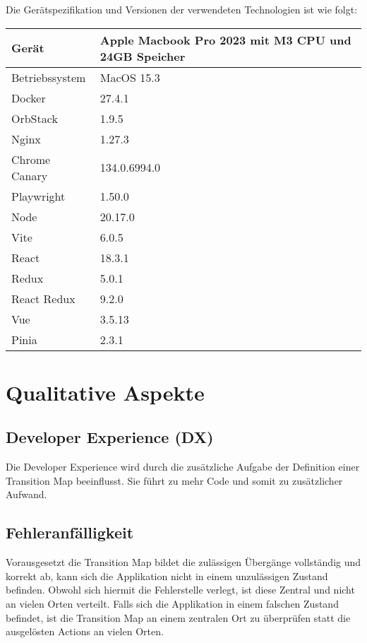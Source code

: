 Die Gerätspezifikation und Versionen der verwendeten Technologien ist wie folgt:

\begin{center}
  \begin{tabular}{ | m{5cm}| m{5cm} | } 
    \hline
    Gerät & Apple Macbook Pro 2023 mit M3 CPU und 24GB Speicher \\ 
    \hline
    Betriebssystem & MacOS 15.3 \\ 
    \hline
    Docker & 27.4.1 \\ 
    \hline
    OrbStack & 1.9.5 \\ 
    \hline
    Nginx & 1.27.3 \\ 
    \hline
    Chrome Canary & 134.0.6994.0 \\ 
    \hline
    Playwright & 1.50.0 \\ 
    \hline
    Node & 20.17.0 \\ 
    \hline
    Vite & 6.0.5 \\ 
    \hline
    React & 18.3.1 \\ 
    \hline
    Redux & 5.0.1 \\ 
    \hline
    React Redux & 9.2.0 \\ 
    \hline
    Vue & 3.5.13 \\ 
    \hline
    Pinia & 2.3.1 \\ 
    \hline
  \end{tabular}
\end{center}

\section{Qualitative Aspekte}

\subsection{Developer Experience (DX)}
Die Developer Experience wird durch die zusätzliche Aufgabe der Definition einer Transition Map beeinflusst. Sie führt zu mehr Code und somit zu zusätzlicher Aufwand.

\subsection{Fehleranfälligkeit}
Vorausgesetzt die Transition Map bildet die zulässigen Übergänge vollständig und korrekt ab, kann sich die Applikation nicht in einem unzulässigen Zustand befinden. Obwohl sich hiermit die Fehlerstelle verlegt, ist diese Zentral und nicht an vielen Orten verteilt. Falls sich die Applikation in einem falschen Zustand befindet, ist die Transition Map an einem zentralen Ort zu überprüfen statt die ausgelösten Actions an vielen Orten.

